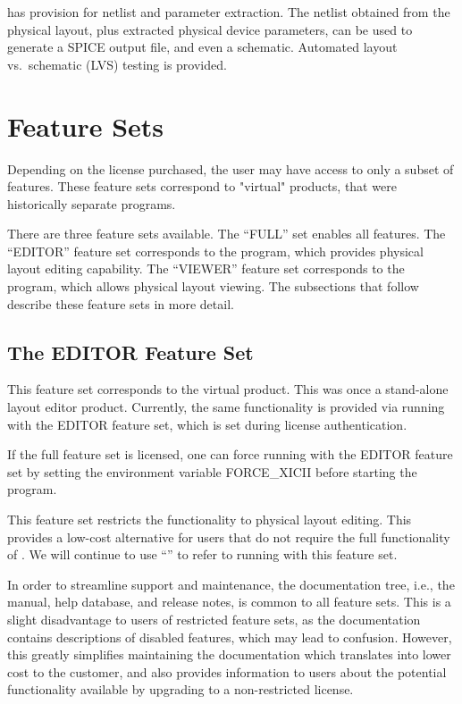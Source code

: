 {\Xic} has provision for netlist and parameter extraction.  The
netlist obtained from the physical layout, plus extracted physical
device parameters, can be used to generate a SPICE output file, and
even a schematic.  Automated layout vs.~schematic (LVS) testing is
provided.

\section{{\Xic} Feature Sets}

Depending on the license purchased, the user may have access to only a
subset of features.  These feature sets correspond to "virtual"
products, that were historically separate programs.

There are three feature sets available.  The ``{\vt FULL}'' set enables
all {\Xic} features.  The ``{\vt EDITOR}'' feature set corresponds to the
{\XicII} program, which provides physical layout editing capability.
The ``{\vt VIEWER}'' feature set corresponds to the {\Xiv} program, which
allows physical layout viewing.  The subsections that follow describe these
feature sets in more detail.

\subsection{The EDITOR Feature Set}
This feature set corresponds to the {\XicII} virtual product.  This
was once a stand-alone layout editor product.  Currently, the same
functionality is provided via running {\Xic} with the EDITOR feature
set, which is set during license authentication.

If the full {\Xic} feature set is licensed, one can force running with
the EDITOR feature set by setting the environment variable {\et
FORCE\_XICII} before starting the {\Xic} program.

This feature set restricts the functionality to physical layout
editing.  This provides a low-cost alternative for users that do not
require the full functionality of {\Xic}.  We will continue to use
``{\XicII}'' to refer to {\Xic} running with this feature set.

In order to streamline support and maintenance, the documentation
tree, i.e., the manual, help database, and release notes, is common to
all feature sets.  This is a slight disadvantage to users of
restricted feature sets, as the documentation contains descriptions of
disabled features, which may lead to confusion.  However, this greatly
simplifies maintaining the documentation which translates into lower
cost to the customer, and also provides information to users about the
potential functionality available by upgrading to a non-restricted
license.

